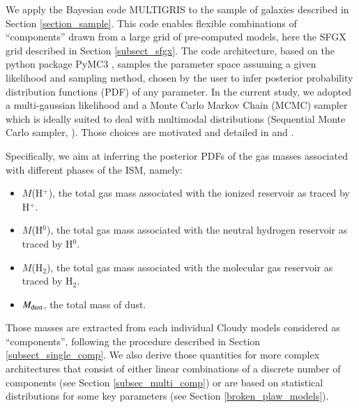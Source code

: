\documentclass{aa}
\begin{document}
We apply the Bayesian code MULTIGRIS \citep{MULTIGRIS2022} to the sample of galaxies described in Section \ref{section_sample}. This code enables flexible combinations of “components” drawn from a large grid of pre-computed models, here the SFGX grid described in Section \ref{subsect_sfgx}. The code architecture, based on the python package PyMC3 \citep{pymc3_paper, PyMC3}, samples the parameter space assuming a given likelihood and sampling method, chosen by the user to infer posterior probability distribution functions (PDF) of any parameter. In the current study, we adopted a multi-gaussian likelihood and a Monte Carlo Markov Chain (MCMC) sampler which is ideally suited to deal with multimodal distributions (Sequential Monte Carlo sampler, \citealt{Minson_2013,Ching_2007}). Those choices are motivated and detailed in \cite{LebouteillerRamambason2022} and \cite{Ramambason2022}.

Specifically, we aim at inferring the posterior PDFs of the gas masses associated with different phases of the ISM, namely:
\begin{itemize}
    \item $M$(H$^+$), the total gas mass associated with the ionized reservoir as traced by H$^{+}$.
    \item $M$(H$^0$),  the total gas mass associated with the neutral hydrogen reservoir as traced by H$^0$.
    \item $M$(H$_2$),  the total gas mass associated with the molecular gas reservoir as traced by H$_2$.
    \item $M_{\rm dust}$, the total mass of dust.
\end{itemize}

Those masses are extracted from each individual Cloudy models considered as “components”, following the procedure described in Section \ref{subsect_single_comp}. We also derive those quantities for more complex architectures that consist of either linear combinations of a discrete number of components (see Section \ref{subsec_multi_comp}) or are based on statistical distributions for some key parameters (see Section \ref{broken_plaw_models}).
\end{document}
